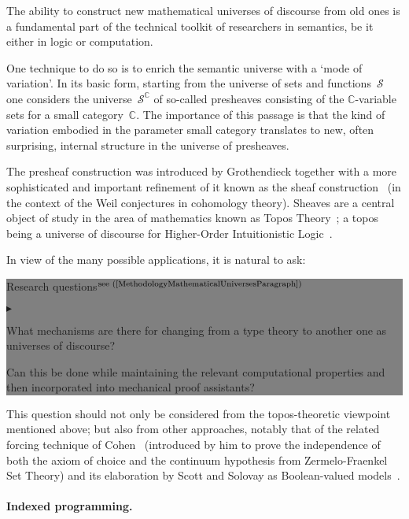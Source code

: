 \documentclass[11pt,twocolumn]{article}
\newenvironment{btritemize}
  {\begin{list}{\btr}
  {\setlength{\topsep}{2pt}
   \setlength{\partopsep}{2pt}
   \setlength{\itemsep}{2.5pt}
   \setlength{\parsep}{2.5pt}
   \setlength{\leftmargin}{1em}
   \setlength{\labelwidth}{.5em}}}
  {\end{list}}
\newcommand{\mytextsf}[1]{\textsf{\small #1}}
\newcommand{\btr}{$\blacktriangleright$}
\newcommand{\reqpsize}{8.113395cm}%
\newcommand{\reqs}[2]{\begin{center}\colorbox{grey}{\begin{minipage}{\reqpsize}
  \mytextsf{Research questions}\hfill$^{\mbox{\scriptsize see #1 }}$\\[-5.5mm]
  \begin{btritemize}
  \item #2
  \end{btritemize}
\end{minipage}}\end{center}}
\newcommand{\Set}{{\boldsymbol{\mathscr S}}}
\newcommand{\scat}[1]{\mathbb{#1}}
\begin{document}
The ability to construct new mathematical universes of discourse from old ones
is a fundamental part of the technical toolkit of researchers in semantics, be
it either in logic or computation.

One technique to do so is to enrich the semantic universe with a `mode of
variation'.  In its basic form, starting from the universe of sets and
functions~$\Set$ one considers the universe~$\Set^{\scat C}$ of so-called
presheaves consisting of the \mbox{$\scat C$-variable} sets for a small
category~$\scat C$.  The importance of this passage is that the kind of
variation embodied in the parameter small category translates to new, often
surprising, internal structure in the universe of presheaves.  

The presheaf construction was introduced by Grothendieck together with a
more sophisticated and important refinement of it known as the sheaf
construction~\cite{SGA4} (in the context of the Weil conjectures in
cohomology theory).  Sheaves are a central object of study in the area of
mathematics known as Topos Theory~\cite{Elephant}; a topos being a
universe of discourse for Higher-Order Intuitionistic
Logic~\cite{LambekScott}.  

In view of the many possible applications, it is natural to ask:
\reqs{(\ref{MethodologyMathematicalUniversesParagraph})}
  {What mechanisms are there for changing from a type theory to another one
    as universes of discourse? 

    Can this be done while maintaining the relevant computational properties
    and then incorporated into mechanical proof assistants?}

This question should not only be considered from the topos-theoretic viewpoint
mentioned above; but also from other approaches, notably that of the related
forcing technique of Cohen~\cite{Cohen} (introduced by him to prove the
independence of both the axiom of choice and the continuum hypothesis from
Zermelo-Fraenkel Set Theory) and its elaboration by Scott and Solovay as
Boolean-valued models~\cite{ScottSolovay}.


\paragraph{Indexed programming.}
\label{IndexedProgrammingIntro}
\end{document}
